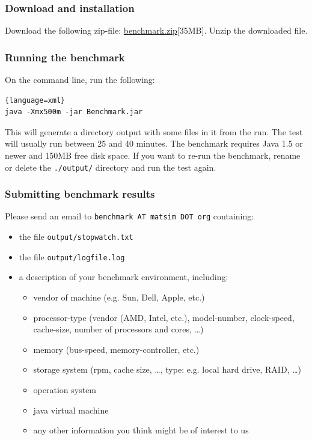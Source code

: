 \subsubsection{Download and installation}
Download the following zip-file: \href{http://matsim.org/files/benchmark/benchmark.zip}{benchmark.zip}{[35MB]}. Unzip the downloaded file.

\subsubsection{Running the benchmark}
On the command line, run the following:
\begin{lstlisting}{language=xml}
java -Xmx500m -jar Benchmark.jar
\end{lstlisting}
This will generate a directory output with some files in it from the run. The test will usually run between 25 and 40 minutes. The benchmark requires Java 1.5 or newer and 150MB free disk space. If you want to re-run the benchmark, rename or delete the \texttt{./output/} directory and run the test again.

\subsubsection{Submitting benchmark results}
Please send an email to \texttt{benchmark AT matsim DOT org} containing:
\begin{itemize}
\item the file \texttt{output/stopwatch.txt}
\item the file \texttt{output/logfile.log}
\item a description of your benchmark environment, including:
\begin{itemize}
\item vendor of machine (e.g. Sun, Dell, Apple, etc.)
\item processor-type (vendor (AMD, Intel, etc.), model-number, clock-speed, cache-size, number of processors and cores, \ldots)
\item memory (bus-speed, memory-controller, etc.)
\item storage system (rpm, cache size, \ldots, type: e.g. local hard drive, RAID, \ldots)
\item operation system
\item java virtual machine
\item any other information you think might be of interest to us
\end{itemize}
\end{itemize}

